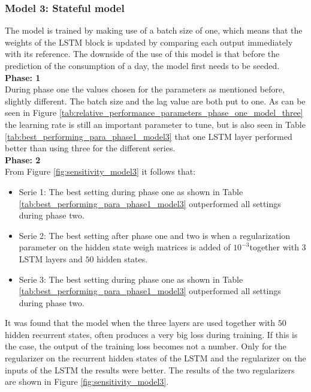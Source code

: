 \newpage
\subsubsection{Model 3: Stateful model}
The model is trained by making use of a batch size of one, which means that the weights of the LSTM block is updated by comparing each output immediately with its reference. The downside of the use of this model is that before the prediction of the consumption of a day, the model first needs to be seeded.\\

\textbf{Phase: 1}\\
During phase one the values chosen for the parameters as mentioned before, slightly different. The batch size and the lag value are both put to one. As can be seen in Figure \ref{tab:relative_performance_parameters_phase_one_model_three} the learning rate is still an important parameter to tune, but is also seen in Table \ref{tab:best_performing_para_phase1_model3} that one LSTM layer performed better than using three for the different series.\\ 

\textbf{Phase: 2}\\
From Figure \ref{fig:sensitivity_model3} it follows that:
\begin{itemize}
	\item Serie 1: The best setting during phase one as shown in Table \ref{tab:best_performing_para_phase1_model3} outperformed all settings during phase two. 
	\item Serie 2: The best setting after phase one and two is when a regularization parameter on the hidden state weigh matrices is added of $ 10^{-3} $together with $ 3 $ LSTM layers and $ 50 $ hidden states.
	\item Serie 3: The best setting during phase one as shown in Table \ref{tab:best_performing_para_phase1_model3} outperformed all settings during phase two. 
\end{itemize}

It was found that the model when the three layers are used together with $ 50 $ hidden recurrent states, often produces a very big loss during training. If this is the case, the output of the training loss becomes not a number. Only for the regularizer on the recurrent hidden states of the LSTM and the regularizer on the inputs of the LSTM the results were better. The results of the two regularizers are shown in Figure \ref{fig:sensitivity_model3}.\\

